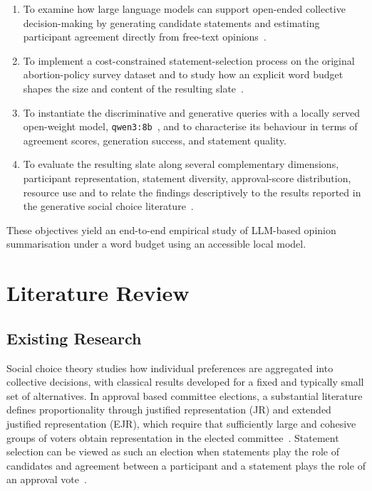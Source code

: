 \documentclass[letterpaper,11pt]{article}
\theoremstyle{plain}
\theoremstyle{definition}
\begin{document}
\begin{enumerate}
\item To examine how large language models can support open-ended collective decision-making by generating candidate statements and estimating participant agreement directly from free-text opinions~\citep{fish2026gsc}. \smallskip

\item To implement a cost-constrained statement-selection process on the original abortion-policy survey dataset and to study how an explicit word budget shapes the size and content of the resulting slate~\citep{boehmer2025nextgen}. \smallskip

\item To instantiate the discriminative and generative queries with a locally served open-weight model, \texttt{qwen3:8b}~\citep{yang2025qwen3}, and to characterise its behaviour in terms of agreement scores, generation success, and statement quality. \smallskip

\item To evaluate the resulting slate along several complementary dimensions, participant representation, statement diversity, approval-score distribution, resource use and to relate the findings descriptively to the results reported in the generative social choice literature~\citep{fish2026gsc,boehmer2025nextgen}.
\end{enumerate}

These objectives yield an end-to-end empirical study of LLM-based opinion summarisation under a word budget using an accessible local model.


\section{Literature Review}

\subsection{Existing Research}

Social choice theory studies how individual preferences are aggregated into collective decisions, with classical results developed for a fixed and typically small set of alternatives. In approval based committee elections, a substantial literature defines proportionality through justified representation (JR) and extended justified representation (EJR), which require that sufficiently large and cohesive groups of voters obtain representation in the elected committee~\citep{aziz2017jr}. Statement selection can be viewed as such an election when statements play the role of candidates and agreement between a participant and a statement plays the role of an approval vote~\citep{fish2026gsc}.
\end{document}
